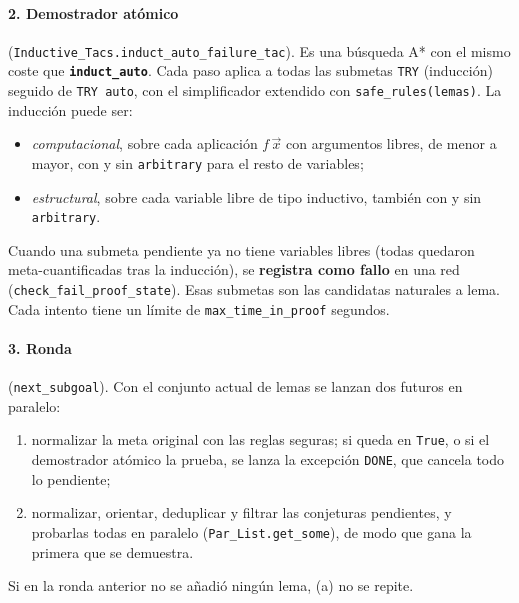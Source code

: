 \documentclass[11pt,a4paper]{article}
\newcommand{\isa}[1]{\texttt{#1}}
\newcommand{\cmd}[1]{\textbf{\texttt{#1}}}
\theoremstyle{definition}
\theoremstyle{remark}
\begin{document}
\paragraph{2. Demostrador atómico} (\isa{Inductive\_Tacs.induct\_auto\_failure\_tac}).
Es una búsqueda A* con el mismo coste que \cmd{induct\_auto}. Cada paso aplica a
todas las submetas \isa{TRY} (inducción) seguido de \isa{TRY auto}, con el
simplificador extendido con \isa{safe\_rules(lemas)}. La inducción puede ser:
\begin{itemize}[nosep]
  \item \emph{computacional}, sobre cada aplicación $f\,\vec x$ con argumentos libres,
        de menor a mayor, con y sin \isa{arbitrary} para el resto de variables;
  \item \emph{estructural}, sobre cada variable libre de tipo inductivo, también con
        y sin \isa{arbitrary}.
\end{itemize}
Cuando una submeta pendiente ya no tiene variables libres (todas quedaron
meta-cuantificadas tras la inducción), se \textbf{registra como fallo} en una red
(\isa{check\_fail\_proof\_state}). Esas submetas son las candidatas naturales a lema.
Cada intento tiene un límite de \isa{max\_time\_in\_proof} segundos.

\paragraph{3. Ronda} (\isa{next\_subgoal}).
Con el conjunto actual de lemas se lanzan dos futuros en paralelo:
\begin{enumerate}[label=(\alph*),nosep]
  \item normalizar la meta original con las reglas seguras; si queda en
        \isa{True}, o si el demostrador atómico la prueba, se lanza la excepción
        \isa{DONE}, que cancela todo lo pendiente;
  \item normalizar, orientar, deduplicar y filtrar las conjeturas pendientes, y
        probarlas todas en paralelo (\isa{Par\_List.get\_some}), de modo que gana
        la primera que se demuestra.
\end{enumerate}
Si en la ronda anterior no se añadió ningún lema, (a) no se repite.
\end{document}
